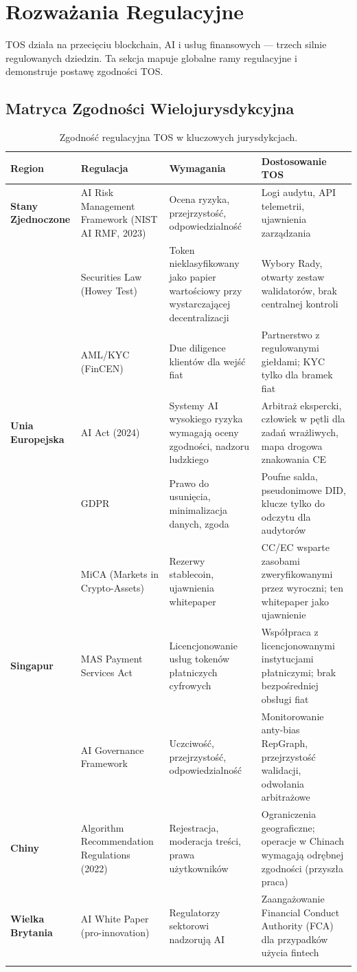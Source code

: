 \documentclass[11pt]{article}
\begin{document}
\section{Rozważania Regulacyjne}
\label{sec:regulatory}

TOS działa na przecięciu blockchain, AI i usług finansowych — trzech silnie regulowanych dziedzin. Ta sekcja mapuje globalne ramy regulacyjne i demonstruje postawę zgodności TOS.

\subsection{Matryca Zgodności Wielojurysdykcyjna}

\begin{longtable}{@{}p{}p{}p{}p{}@{}}
\toprule
\textbf{Region} & \textbf{Regulacja} & \textbf{Wymagania} & \textbf{Dostosowanie TOS} \\\midrule
\textbf{Stany Zjednoczone} & AI Risk Management Framework (NIST AI RMF, 2023) & Ocena ryzyka, przejrzystość, odpowiedzialność & Logi audytu, API telemetrii, ujawnienia zarządzania \\
 & Securities Law (Howey Test) & Token nieklasyfikowany jako papier wartościowy przy wystarczającej decentralizacji & Wybory Rady, otwarty zestaw walidatorów, brak centralnej kontroli \\
 & AML/KYC (FinCEN) & Due diligence klientów dla wejść fiat & Partnerstwo z regulowanymi giełdami; KYC tylko dla bramek fiat \\
\textbf{Unia Europejska} & AI Act (2024) & Systemy AI wysokiego ryzyka wymagają oceny zgodności, nadzoru ludzkiego & Arbitraż ekspercki, człowiek w pętli dla zadań wrażliwych, mapa drogowa znakowania CE \\
 & GDPR & Prawo do usunięcia, minimalizacja danych, zgoda & Poufne salda, pseudonimowe DID, klucze tylko do odczytu dla audytorów \\
 & MiCA (Markets in Crypto-Assets) & Rezerwy stablecoin, ujawnienia whitepaper & CC/EC wsparte zasobami zweryfikowanymi przez wyroczni; ten whitepaper jako ujawnienie \\
\textbf{Singapur} & MAS Payment Services Act & Licencjonowanie usług tokenów płatniczych cyfrowych & Współpraca z licencjonowanymi instytucjami płatniczymi; brak bezpośredniej obsługi fiat \\
 & AI Governance Framework & Uczciwość, przejrzystość, odpowiedzialność & Monitorowanie anty-bias RepGraph, przejrzystość walidacji, odwołania arbitrażowe \\
\textbf{Chiny} & Algorithm Recommendation Regulations (2022) & Rejestracja, moderacja treści, prawa użytkowników & Ograniczenia geograficzne; operacje w Chinach wymagają odrębnej zgodności (przyszła praca) \\
\textbf{Wielka Brytania} & AI White Paper (pro-innovation) & Regulatorzy sektorowi nadzorują AI & Zaangażowanie Financial Conduct Authority (FCA) dla przypadków użycia fintech \\
\bottomrule
\caption{Zgodność regulacyjna TOS w kluczowych jurysdykcjach.}
\end{longtable}
\end{document}
